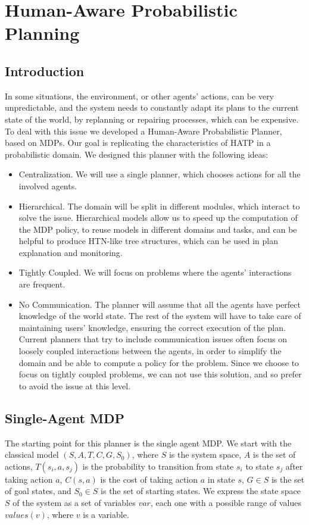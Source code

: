 
\chapter{Human-Aware Probabilistic Planning}
\label{subsec:plan_management-happ}


\section{Introduction}
In some situations, the environment, or other agents' actions, can be very unpredictable, and the system needs to constantly adapt its plans to the current state of the world, by replanning or repairing processes, which can be expensive. To deal with this issue we developed a Human-Aware Probabilistic Planner, based on MDPs. Our goal is replicating the characteristics of HATP in a probabilistic domain. We designed this planner with the following ideas:

\begin{itemize}
\item Centralization. We will use a single planner, which chooses actions for all the involved agents.
\item Hierarchical. The domain will be split in different modules, which interact to solve the issue. Hierarchical models allow us to speed up the computation of the MDP policy, to reuse models in different domains and tasks, and can be helpful to produce HTN-like tree structures, which can be used in plan explanation and monitoring.
\item Tightly Coupled. We will focus on problems where the agents' interactions are frequent.
\item No Communication. The planner will  assume that all the agents have perfect knowledge of the world state. The rest of the system will have to take care of maintaining users' knowledge, ensuring the correct execution of the plan. Current planners that try to include communication issues often focus on loosely coupled interactions between the agents, in order to simplify the domain and be able to compute a policy for the problem. Since we choose to focus on tightly coupled problems, we can not use this solution, and so prefer to avoid the issue at this level.
\end{itemize}


\section{Single-Agent MDP}
The starting point for this planner is the single agent MDP. We start with the classical model $(S,A,T,C,G,S_0)$, where $S$ is the system space, $A$ is the set of actions, $T(s_i,a,s_j)$ is the probability to transition from state $s_i$ to state $s_j$ after taking action $a$, $C(s,a)$ is the cost of taking action $a$ in state $s$, $G \in S$ is the set of goal states, and $S_0 \in S$ is the set of starting states. We express the state space $S$ of the system as a set of variables $var$, each one with a possible range of values $values(v)$, where $v$ is a variable.

